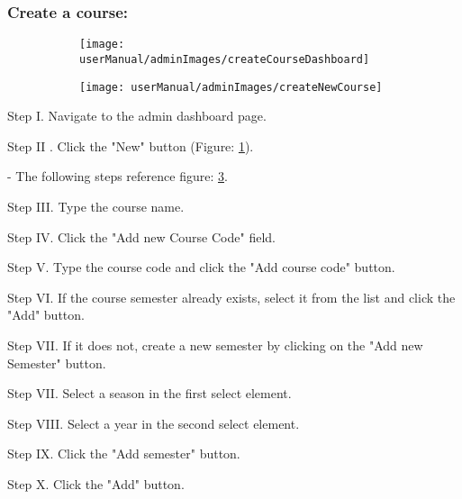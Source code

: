 \subsubsection{Create a course:}

\begin{figure}[H]
	\begin{subfigure}{0.70\linewidth}
		\texttt{[image: userManual/adminImages/createCourseDashboard]}
		\caption{}
		\label{fig:createCourseDashboard}
	\end{subfigure}
	\begin{subfigure}{0.70\linewidth}
		\texttt{[image: userManual/adminImages/createNewCourse]}
		\caption{}
		\label{fig:createNewCourse}
	\end{subfigure}
\end{figure}

\begin{userManualItemlist}
    \item[Step I.] Navigate to the admin dashboard page.
    \item[Step II]. Click the "New" button (Figure: \ref{fig:createCourseDashboard}).
    \item[-] The following steps reference figure: \ref{fig:createNewCourse}. 
    \item[Step III.] Type the course name.
    \item[Step IV.] Click the "Add new Course Code" field.
    \item[Step V.] Type the course code and click the "Add course code" button.
    \item[Step VI.] If the course semester already exists, select it from the list and click the "Add" button.
    \item[Step VII.] If it does not, create a new semester by clicking on the "Add new Semester" button.
    \item[Step VII.] Select a season in the first select element.
    \item[Step VIII.] Select a year in the second select element.
    \item[Step IX.] Click the "Add semester" button.
    \item[Step X.] Click the "Add" button.    
\end{userManualItemlist}